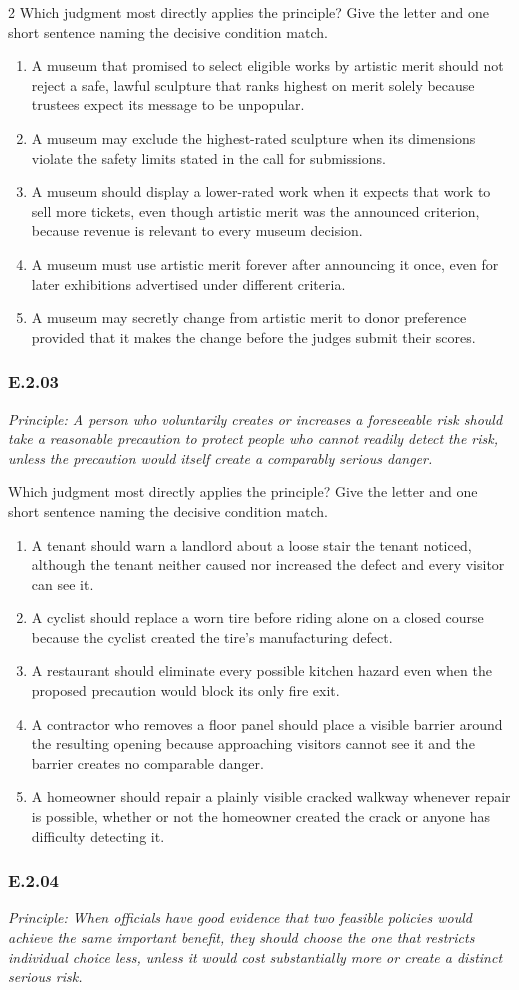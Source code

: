 \documentclass[10pt]{extarticle}
\newcommand{\choice}[1]{\item #1}
\newcommand{\bankitem}[1]{\subsubsection*{#1}}
\begin{document}
\begin{multicols}{2}
Which judgment most directly applies the principle? Give the letter and one short sentence naming the decisive condition match.
\begin{enumerate}[label=(\alph*)]
  \choice{A museum that promised to select eligible works by artistic merit should not reject a safe, lawful sculpture that ranks highest on merit solely because trustees expect its message to be unpopular.}
  \choice{A museum may exclude the highest-rated sculpture when its dimensions violate the safety limits stated in the call for submissions.}
  \choice{A museum should display a lower-rated work when it expects that work to sell more tickets, even though artistic merit was the announced criterion, because revenue is relevant to every museum decision.}
  \choice{A museum must use artistic merit forever after announcing it once, even for later exhibitions advertised under different criteria.}
  \choice{A museum may secretly change from artistic merit to donor preference provided that it makes the change before the judges submit their scores.}
\end{enumerate}
\bankitem{E.2.03}
\emph{Principle: A person who voluntarily creates or increases a foreseeable risk should take a reasonable precaution to protect people who cannot readily detect the risk, unless the precaution would itself create a comparably serious danger.}

Which judgment most directly applies the principle? Give the letter and one short sentence naming the decisive condition match.
\begin{enumerate}[label=(\alph*)]
  \choice{A tenant should warn a landlord about a loose stair the tenant noticed, although the tenant neither caused nor increased the defect and every visitor can see it.}
  \choice{A cyclist should replace a worn tire before riding alone on a closed course because the cyclist created the tire's manufacturing defect.}
  \choice{A restaurant should eliminate every possible kitchen hazard even when the proposed precaution would block its only fire exit.}
  \choice{A contractor who removes a floor panel should place a visible barrier around the resulting opening because approaching visitors cannot see it and the barrier creates no comparable danger.}
  \choice{A homeowner should repair a plainly visible cracked walkway whenever repair is possible, whether or not the homeowner created the crack or anyone has difficulty detecting it.}
\end{enumerate}
\bankitem{E.2.04}
\emph{Principle: When officials have good evidence that two feasible policies would achieve the same important benefit, they should choose the one that restricts individual choice less, unless it would cost substantially more or create a distinct serious risk.}


\end{multicols}
\end{document}
